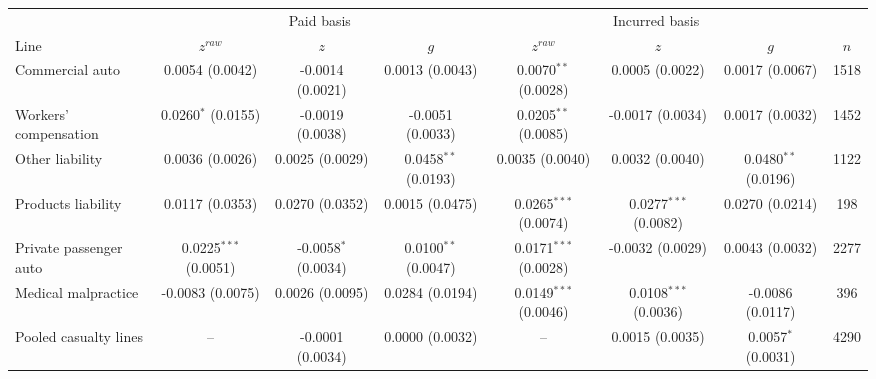 \begin{tabular}{lccccccc}
\toprule
& \multicolumn{3}{c}{Paid basis} & \multicolumn{3}{c}{Incurred basis} & \\
\cmidrule(lr){2-4}\cmidrule(lr){5-7}
Line & $z^{raw}$ & $z$ & $g$ & $z^{raw}$ & $z$ & $g$ & $n$ \\
\midrule
Commercial auto & 0.0054 (0.0042) & -0.0014 (0.0021) & 0.0013 (0.0043) & 0.0070$^{**}$ (0.0028) & 0.0005 (0.0022) & 0.0017 (0.0067) & 1518 \\
Workers' compensation & 0.0260$^{*}$ (0.0155) & -0.0019 (0.0038) & -0.0051 (0.0033) & 0.0205$^{**}$ (0.0085) & -0.0017 (0.0034) & 0.0017 (0.0032) & 1452 \\
Other liability & 0.0036 (0.0026) & 0.0025 (0.0029) & 0.0458$^{**}$ (0.0193) & 0.0035 (0.0040) & 0.0032 (0.0040) & 0.0480$^{**}$ (0.0196) & 1122 \\
Products liability & 0.0117 (0.0353) & 0.0270 (0.0352) & 0.0015 (0.0475) & 0.0265$^{***}$ (0.0074) & 0.0277$^{***}$ (0.0082) & 0.0270 (0.0214) & 198 \\
Private passenger auto & 0.0225$^{***}$ (0.0051) & -0.0058$^{*}$ (0.0034) & 0.0100$^{**}$ (0.0047) & 0.0171$^{***}$ (0.0028) & -0.0032 (0.0029) & 0.0043 (0.0032) & 2277 \\
Medical malpractice & -0.0083 (0.0075) & 0.0026 (0.0095) & 0.0284 (0.0194) & 0.0149$^{***}$ (0.0046) & 0.0108$^{***}$ (0.0036) & -0.0086 (0.0117) & 396 \\
Pooled casualty lines & -- & -0.0001 (0.0034) & 0.0000 (0.0032) & -- & 0.0015 (0.0035) & 0.0057$^{*}$ (0.0031) & 4290 \\
\bottomrule
\end{tabular}
